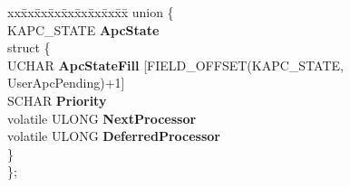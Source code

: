 \begin{DoxyCompactItemize}
\begin{tabbing}
\end{tabbing}\item 
\mbox{\label{struct___k_t_h_r_e_a_d_a2c1588c975f30c0339cccda86253368b}} 
\begin{tabbing}
xx\=xx\=xx\=xx\=xx\=xx\=xx\=xx\=xx\=\kill
union \{\\
\>KAPC\_STATE {\bfseries ApcState}\\
\mbox{\label{union___k_t_h_r_e_a_d_1_1_0D2090_aa82450219acb243aec716d472aa80bf7}} 
\>struct \{\\
\>\>UCHAR {\bfseries ApcStateFill} \mbox{[}FIELD\_OFFSET(KAPC\_STATE, \\
\>\>\>UserApcPending)+1\mbox{]}\\
\>\>SCHAR {\bfseries Priority}\\
\>\>volatile ULONG {\bfseries NextProcessor}\\
\>\>volatile ULONG {\bfseries DeferredProcessor}\\
\>\} \\
\}; \\


\end{tabbing}
\end{DoxyCompactItemize}
